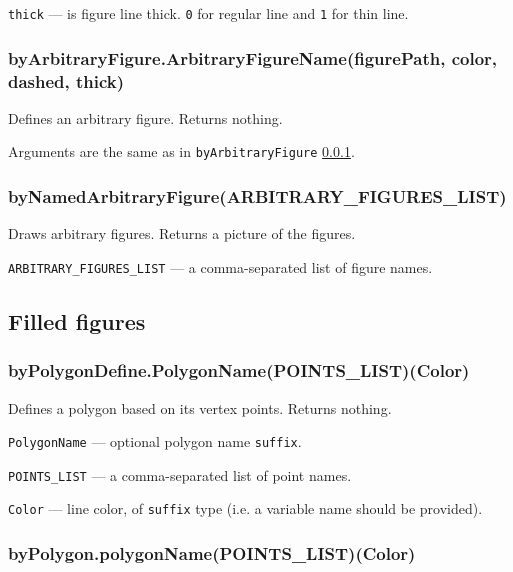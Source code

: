 \documentclass{ltxdoc}
\begin{document}
	\texttt{thick} — is figure line thick. \texttt{0} for regular line and \texttt{1} for thin line.

\subsubsection{byArbitraryFigure.ArbitraryFigureName(figurePath, color, dashed, thick)}\label{byArbitraryFigure}

	Defines an arbitrary figure. Returns nothing.
	
	Arguments are the same as in \texttt{byArbitraryFigure} \ref{byArbitraryFigure}.

\subsubsection{byNamedArbitraryFigure(ARBITRARY\_FIGURES\_LIST)}\label{byNamedArbitraryFigure}

	Draws arbitrary figures. Returns a picture of the figures.
	
	\texttt{ARBITRARY\_FIGURES\_LIST} — a comma-separated list of figure names.


\subsection{Filled figures}


\subsubsection{byPolygonDefine.PolygonName(POINTS\_LIST)(Color)}\label{byPolygonDefine}

	Defines a polygon based on its vertex points. Returns nothing.
	
	\texttt{PolygonName} — optional polygon name \texttt{suffix}.
	
	\texttt{POINTS\_LIST} — a comma-separated list of point names.
	
	\texttt{Color} — line color, of \texttt{suffix} type (i.e. a variable name should be provided).


\subsubsection{byPolygon.polygonName(POINTS\_LIST)(Color)}\label{byPolygon}
\end{document}
